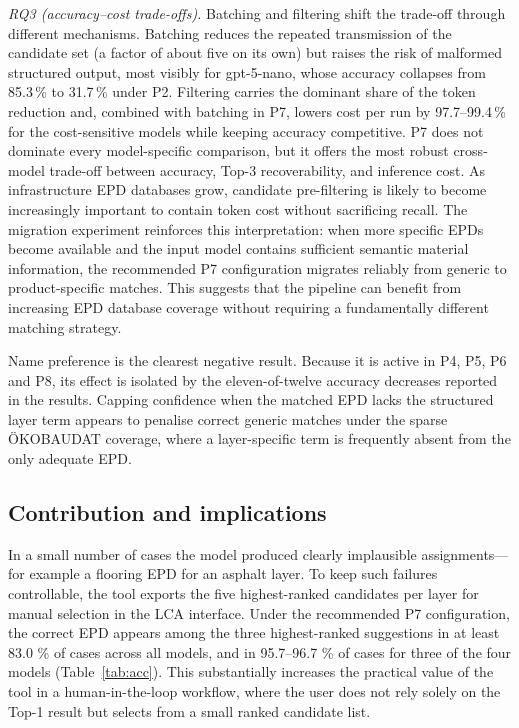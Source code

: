 \documentclass[10pt, a4paper, twocolumn]{article}
\begin{document}
\textit{RQ3 (accuracy--cost trade-offs).} Batching and filtering shift the
trade-off through different mechanisms. Batching reduces the repeated transmission
of the candidate set (a factor of about five on its own) but raises the risk of
malformed structured output, most visibly for gpt-5-nano, whose accuracy collapses
from 85.3\,\% to 31.7\,\% under P2. Filtering carries the dominant share of the
token reduction and, combined with batching in P7, lowers cost per run by
97.7--99.4\,\% for the cost-sensitive models while keeping accuracy competitive.
P7 does not dominate every model-specific comparison, but it offers the most robust cross-model trade-off between accuracy, Top-3 recoverability, and inference cost. As infrastructure EPD
databases grow, candidate pre-filtering is likely to become increasingly important
to contain token cost without sacrificing recall. The migration experiment reinforces this interpretation: when more specific EPDs become available and the input model contains sufficient semantic material information, the recommended P7 configuration migrates reliably from generic to product-specific matches. This suggests that the pipeline can benefit from increasing EPD database coverage without requiring a fundamentally different matching strategy.


Name preference is the clearest negative result. Because it is active in P4, P5,
P6 and P8, its effect is isolated by the eleven-of-twelve accuracy decreases
reported in the results. Capping confidence when the matched EPD
lacks the structured layer term appears to penalise correct generic matches under
the sparse \"OKOBAUDAT coverage, where a layer-specific term is frequently absent
from the only adequate EPD. 

\subsection{Contribution and implications}

In a small number of cases the model produced clearly implausible assignments---for
example a flooring EPD for an asphalt layer. To keep such failures controllable, the
tool exports the five highest-ranked candidates per layer for manual selection in the
LCA interface. 
Under the recommended P7 configuration, the correct EPD appears among the three highest-ranked suggestions in at least 83.0 \% of cases across all models, and in 95.7--96.7 \% of cases for three of the four models (Table~\ref{tab:acc}). This substantially increases the practical value of the tool in a human-in-the-loop workflow, where the user does not rely solely on the Top-1 result but selects from a small ranked candidate list.
\end{document}
